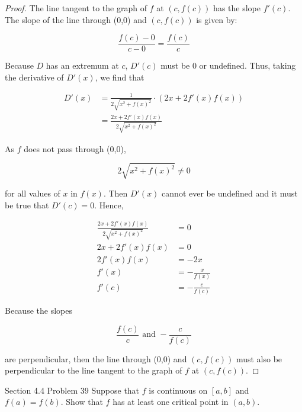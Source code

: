 \documentclass{article}
\begin{document}
    \begin{proof}
        The line tangent to the graph of $f$ at $(c,f(c))$ has the slope $f'(c)$. The slope of the line through (0,0) and $(c,f(c))$ is given by:

        \[
            \frac{f(c)-0}{c-0} = \frac{f(c)}{c}
        \]

        Because $D$ has an extremum at $c$, $D'(c)$ must be 0 or undefined. Thus, taking the derivative of $D'(x)$, we find that

        \begin{align*}
            D'(x)   &= \frac{1}{2\sqrt{x^2 + f(x)^2}} \cdot (2x+2f'(x)f(x)) \\
                    &= \frac{2x + 2f'(x)f(x)}{2\sqrt{x^2+f(x)^2}}
        \end{align*}

        \pagebreak

        As $f$ does not pass through (0,0),

        \[
            2\sqrt{x^2+f(x)^2} \not = 0
        \]

        for all values of $x$ in $f(x)$. Then $D'(x)$ cannot ever be undefined and it must be true that $D'(c)=0$. Hence,

        \begin{align*}
            \frac{2x+2f'(x)f(x)}{2\sqrt{x^2+f(x)^2}}    &= 0 \\
            2x + 2f'(x)f(x)                             &= 0 \\
            2f'(x)f(x)                                  &= -2x \\
            f'(x)                                       &= -\frac{x}{f(x)} \\
            f'(c)                                       &= -\frac{c}{f(c)}
        \end{align*}

        Because the slopes

        \[
            \frac{f(c)}{c}  \text{ and } -\frac{c}{f(c)}
        \]

        are perpendicular, then the line through (0,0) and $(c,f(c))$ must also be perpendicular to the line tangent to the graph of $f$ at $(c,f(c))$.
    \end{proof}


    \begin{tbhtheorem}{Section 4.4 Problem 39}
        Suppose that $f$ is continuous on $[a,b]$ and $f(a)=f(b)$. Show that $f$ has at least one critical point in $(a,b)$.
    \end{tbhtheorem}
\end{document}
